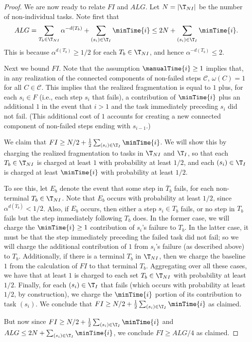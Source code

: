 \begin{proof}
    \medskip

    We are now ready to relate $FI$ and $ALG$.
    Let $N = |\T_{NI}|$ be the number of non-individual tasks.
    Note first that
    \[ ALG = \sum_{T_b \in \T_{NI}} \alpha^{-d(T_b)} + \sum_{(s_i) \in \T_I} \minTime{i} \leq 2N + \sum_{(s_i) \in \T_I} \minTime{i}. \]
    This is because $\alpha^{d(T_b)} \geq 1/2$ for each $T_b \in \T_{NI}$, and hence $\alpha^{-d(T_b)} \leq 2$.

    \medskip

    Next we bound $FI$.
    Note that the assumption $\manualTime{i} \geq 1$ implies that, in any realization of the connected components of non-failed steps $\mathcal{C}$, $\omega(C) = 1$ for all $C \in \mathcal{C}$.
    This implies that the realized fragmentation is equal to $1$ plus, for each $s_i \in F$ (i.e., each step $s_i$ that fails), a contribution of $\minTime{i}$ plus an additional $1$ in the event that $i > 1$ and the task immediately preceding $s_i$ did not fail.
    (This additional cost of $1$ accounts for creating a new connected component of non-failed steps ending with $s_{i-1}$.)

    We claim that $FI \geq N/2 + \frac{1}{2}\sum_{(s_i) \in \T_I} \minTime{i}$.
    We will show this by charging  the realized fragmentation to tasks in $\T_{NI}$ and $\T_I$, so that each $T_b \in \T_{NI}$ is charged at least $1$ with probability at least $1/2$, and each $(s_i) \in \T_I$ is charged at least $\minTime{i}$ with probability at least $1/2$.

    To see this, let $E_b$ denote the event that some step in $\overline{T}_b$ fails, for each non-terminal $T_b \in \T_{NI}$.
    Note that $E_b$ occurs with probability at least $1/2$, since $\alpha^{d(\overline{T}_b)} < 1/2$.
    Also, if $E_b$ occurs, then either a step $s_i \in T_b$ fails, or no step in $T_b$ fails but the step immediately following $T_b$ does.
    In the former case, we will charge the $\minTime{i} \geq 1$ contribution of $s_i$'s failure to $T_b$.
    In the latter case, it must be that the step immediately preceding the failed task did not fail; so we will charge the additional contribution of $1$ from $s_i$'s failure (as described above) to $T_b$.
    Additionally, if there is a terminal $T_b$ in $\T_{NI}$, then we charge the baseline $1$ from the calculation of $FI$ to that terminal $T_b$.
    Aggregating over all these cases, we have that at least $1$ is charged to each set $T_b \in \T_{NI}$ with probability at least $1/2$.
    Finally, for each $(s_i) \in \T_I$ that fails (which occurs with probability at least $1/2$, by construction), we charge the $\minTime{i}$ portion of its contribution to task $(s_i)$.
    We conclude that $FI \geq N/2 + \frac{1}{2}\sum_{(s_i) \in \T_I}\minTime{i}$ as claimed.

    But now since $FI \geq N/2 + \frac{1}{2}\sum_{(s_i) \in \T_I}\minTime{i}$ and $ALG \leq 2N + \sum_{(s_i) \in \T_I}\minTime{i}$, we conclude $FI \geq ALG/4$ as claimed.
\end{proof}

